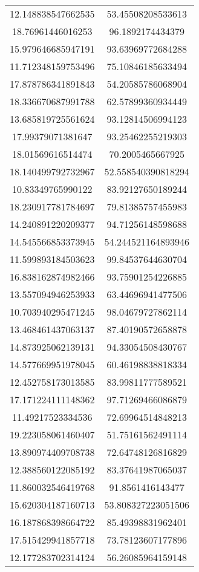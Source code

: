 \begin{table}
\begin{tabular}{cc}
12.148838547662535 & 53.45508208533613 \\
18.76961446016253 & 96.1892174434379 \\
15.979646685947191 & 93.63969772684288 \\
11.712348159753496 & 75.10846185633494 \\
17.878786341891843 & 54.20585786068904 \\
18.336670687991788 & 62.57899360934449 \\
13.685819725561624 & 93.12814506994123 \\
17.99379071381647 & 93.25462255219303 \\
18.01569616514474 & 70.2005465667925 \\
18.140499792732967 & 52.558540390818294 \\
10.83349765990122 & 83.92127650189244 \\
18.230917781784697 & 79.81385757455983 \\
14.240891220209377 & 94.71256148598688 \\
14.545566853373945 & 54.244521164893946 \\
11.599893184503623 & 99.84537644630704 \\
16.838162874982466 & 93.75901254226885 \\
13.557094946253933 & 63.44696941477506 \\
10.703940295471245 & 98.04679727862114 \\
13.468461437063137 & 87.40190572658878 \\
14.873925062139131 & 94.33054508430767 \\
14.577669951978045 & 60.46198838818334 \\
12.452758173013585 & 83.99811777589521 \\
17.171224111148362 & 97.71269466086879 \\
11.49217523334536 & 72.69964514848213 \\
19.223058061460407 & 51.75161562491114 \\
13.890974409708738 & 72.64748126816829 \\
12.388560122085192 & 83.37641987065037 \\
11.860032546419768 & 91.8561416143477 \\
15.620304187160713 & 53.808327223051506 \\
16.187868398664722 & 85.49398831962401 \\
17.515429941857718 & 73.78123607177896 \\
12.177283702314124 & 56.26085964159148 \\

\end{tabular}
\end{table}
